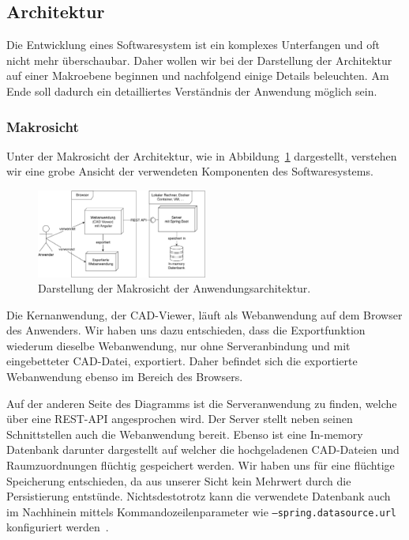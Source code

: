 \subsection{Architektur}
\label{subsec:architecture}

Die Entwicklung eines Softwaresystem ist ein komplexes Unterfangen und oft nicht mehr überschaubar.
Daher wollen wir bei der Darstellung der Architektur auf einer Makroebene beginnen und nachfolgend einige Details beleuchten.
Am Ende soll dadurch ein detailliertes Verständnis der Anwendung möglich sein.

\subsubsection{Makrosicht}
\label{subsubsec:macro-view}

Unter der Makrosicht der Architektur, wie in Abbildung~\ref{fig:macro-view-diagram} dargestellt, verstehen wir eine grobe Ansicht der verwendeten Komponenten des Softwaresystems.

\begin{figure}[h]
    \includegraphics[width=0.5\textwidth]{res/macro.pdf}
    \caption{Darstellung der Makrosicht der Anwendungsarchitektur.}
    \label{fig:macro-view-diagram}
\end{figure}

Die Kernanwendung, der CAD-Viewer, läuft als Webanwendung auf dem Browser des Anwenders.
Wir haben uns dazu entschieden, dass die Exportfunktion wiederum dieselbe Webanwendung, nur ohne Serveranbindung und mit eingebetteter CAD-Datei, exportiert.
Daher befindet sich die exportierte Webanwendung ebenso im Bereich des Browsers.

Auf der anderen Seite des Diagramms ist die Serveranwendung zu finden, welche über eine REST-API angesprochen wird.
Der Server stellt neben seinen Schnittstellen auch die Webanwendung bereit.
Ebenso ist eine In-memory Datenbank darunter dargestellt auf welcher die hochgeladenen CAD-Dateien und Raumzuordnungen flüchtig gespeichert werden.
Wir haben uns für eine flüchtige Speicherung entschieden, da aus unserer Sicht kein Mehrwert durch die Persistierung entstünde.
Nichtsdestotrotz kann die verwendete Datenbank auch im Nachhinein mittels Kommandozeilenparameter wie \texttt{--spring.datasource.url} konfiguriert werden~\cite{JDBCSpringBoot}.

